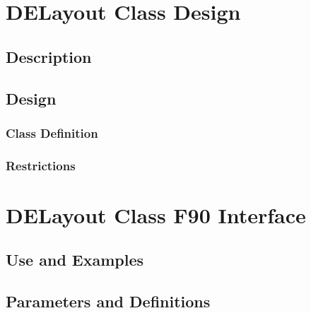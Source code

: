 \documentclass[]{article}
\begin{document}




\section{DELayout Class Design}

\subsection{Description}




\subsection{Design}




\subsubsection{Class Definition}




\subsubsection{Restrictions}

%


\section{DELayout Class F90 Interface}

\subsection{Use and Examples}

%


\subsection{Parameters and Definitions}

%



%
\end{document}
